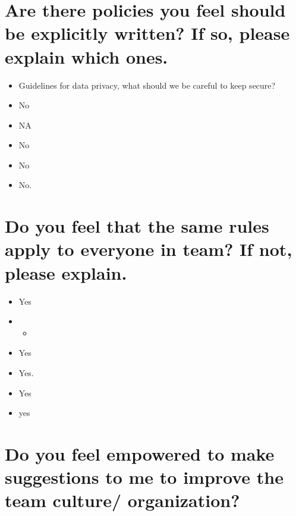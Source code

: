\documentclass[
]{book}
\providecommand{\tightlist}{%
  \setlength{\itemsep}{0pt}\setlength{\parskip}{0pt}}
\begin{document}
\hypertarget{are-there-policies-you-feel-should-be-explicitly-written-if-so-please-explain-which-ones.}{%
\section{Are there policies you feel should be explicitly written? If so, please explain which ones.}\label{are-there-policies-you-feel-should-be-explicitly-written-if-so-please-explain-which-ones.}}

\begin{itemize}
\tightlist
\item
  Guidelines for data privacy, what should we be careful to keep secure?
\item
  No
\item
  NA
\item
  No
\item
  No
\item
  No.
\end{itemize}

\hypertarget{do-you-feel-that-the-same-rules-apply-to-everyone-in-team-if-not-please-explain.}{%
\section{Do you feel that the same rules apply to everyone in team? If not, please explain.}\label{do-you-feel-that-the-same-rules-apply-to-everyone-in-team-if-not-please-explain.}}

\begin{itemize}
\item
  Yes
\item
  \begin{itemize}
  \tightlist
  \item
  \end{itemize}
\item
  Yes
\item
  Yes.
\item
  Yes
\item
  yes
\end{itemize}

\hypertarget{do-you-feel-empowered-to-make-suggestions-to-me-to-improve-the-team-culture-organization}{%
\section{Do you feel empowered to make suggestions to me to improve the team culture/ organization?}\label{do-you-feel-empowered-to-make-suggestions-to-me-to-improve-the-team-culture-organization}}
\end{document}
